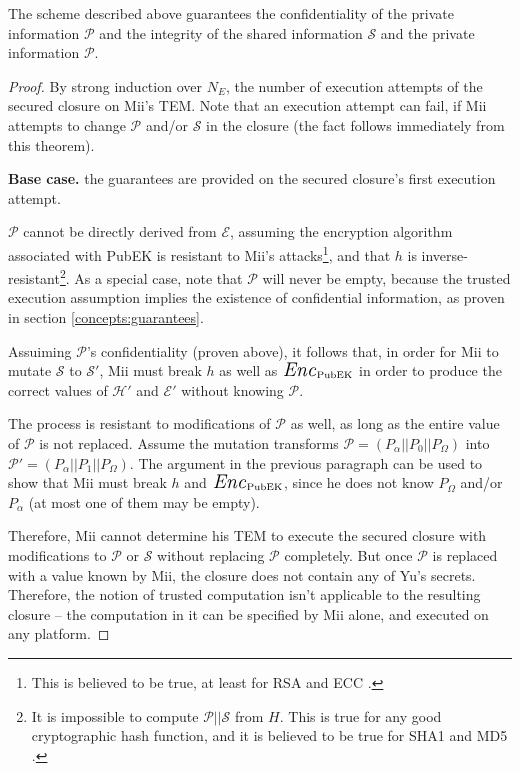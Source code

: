 \begin{theorem*}
The scheme described above guarantees the confidentiality of the
private information $\mathcal P$ and the integrity of the shared information $\mathcal S$ and
the private information $\mathcal P$.
\end{theorem*}
\begin {proof}
By strong induction over $N_E$, the number of execution attempts of the secured
closure on Mii's TEM. Note that an execution attempt can fail, if Mii attempts
to change $\mathcal P$ and/or $\mathcal S$ in the closure (the fact follows
immediately from this theorem).

\textbf{Base case.} the guarantees are provided on the secured closure's first
execution attempt.

$\mathcal P$ cannot be directly derived from $\mathcal E$, assuming the
encryption algorithm associated with PubEK is resistant to Mii's
attacks\footnote{This is believed to be true, at least
for RSA \cite{rivest1978mod} and ECC \cite{koblitz1987ecc}.}, and that $h$ is
inverse-resistant\footnote{It is impossible to compute $\mathcal P || \mathcal
S$ from $H$. This is true for any good cryptographic hash function, and it is
believed to be true for SHA1 \cite{eastlake2001rus} and MD5
\cite{rivest1992rmm}.}. As a special case, note that $\mathcal P$ will never be
empty, because the trusted execution assumption implies the existence of
confidential information, as proven in section \ref{concepts:guarantees}.

Assuiming $\mathcal P$'s confidentiality (proven above), it follows that, in
order for Mii to mutate $\mathcal S$ to $\mathcal S'$, Mii must break $h$ as
well as ${\mbox{\Large \textit{Enc}}}_\textrm{PubEK}$ in order to produce
the correct values of $\mathcal H'$ and $\mathcal E'$ without knowing
$\mathcal P$.

The process is resistant to modifications of $\mathcal P$
as well, as long as the entire value of $\mathcal P$ is not replaced. Assume
the mutation transforms $\mathcal P = (P_\alpha || P_0 || P_\Omega)$ into
$\mathcal P' = (P_\alpha || P_1 || P_\Omega)$. The argument in the previous
paragraph can be used to show that Mii must break $h$ and ${\mbox{\Large
\textit{Enc}}}_\textrm{PubEK}$, since he does not know $P_\Omega$ and/or
$P_\alpha$ (at most one of them may be empty).

Therefore, Mii cannot determine his TEM to execute the secured closure with
modifications to $\mathcal P$ or $\mathcal S$ without replacing $\mathcal P$
completely. But once $\mathcal P$ is replaced with a value known by Mii, the
closure does not contain any of Yu's secrets. Therefore, the notion of trusted
computation isn't applicable to the resulting closure -- the computation in it
can be specified by Mii alone, and executed on any platform.


\end{proof}
